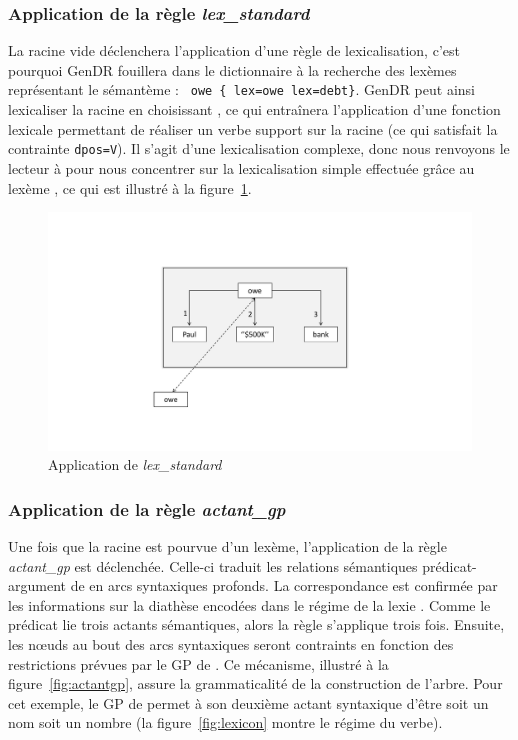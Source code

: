 \subsubsection{Application de la règle \emph{lex\_standard}}
La racine vide déclenchera l'application d'une règle de lexicalisation, c'est pourquoi GenDR fouillera dans le dictionnaire à la recherche des lexèmes représentant le sémantème : \lstinline! owe { lex=owe lex=debt}!. GenDR peut ainsi lexicaliser la racine en choisissant , ce qui entraînera l'application d'une fonction lexicale permettant de réaliser un verbe support sur la racine (ce qui satisfait la contrainte \texttt{dpos=V}). Il s'agit d'une lexicalisation complexe, donc nous renvoyons le lecteur à \cite{lambrey15,LambreyImplementationcollocationspour2017,lareau18} pour nous concentrer sur la lexicalisation simple effectuée grâce au lexème , ce qui est illustré à la figure~\ref{fig:lexstand1}.

\begin{figure}[htb]
	\centering
	\includegraphics[width=1\textwidth, trim = {0cm 3.5cm 0cm 4.4cm},clip]{ch3/figs/lex_standard1.pdf}
		\vspace{-0.5cm}
	\caption{Application de \emph{lex\_standard}}
	\label{fig:lexstand1}
\end{figure}

\subsubsection{Application de la règle \emph{actant\_gp}}\label{sec:r-actantgp}
Une fois que la racine est pourvue d'un lexème, l'application de la règle \emph{actant\_gp} est déclenchée. Celle-ci traduit les relations sémantiques prédicat-argument de  en arcs syntaxiques profonds. La correspondance est confirmée par les informations sur la diathèse encodées dans le régime de la lexie . Comme le prédicat lie trois actants sémantiques, alors la règle s'applique trois fois. Ensuite, les n\oe{}uds au bout des arcs syntaxiques seront contraints en fonction des restrictions prévues par le \ac{GP} de . Ce mécanisme, illustré à la figure~\ref{fig:actantgp}, assure la grammaticalité de la construction de l'arbre. Pour cet exemple, le \ac{GP} de  permet à son deuxième actant syntaxique d'être soit un nom soit un nombre (la figure~\ref{fig:lexicon} montre le régime du verbe).

